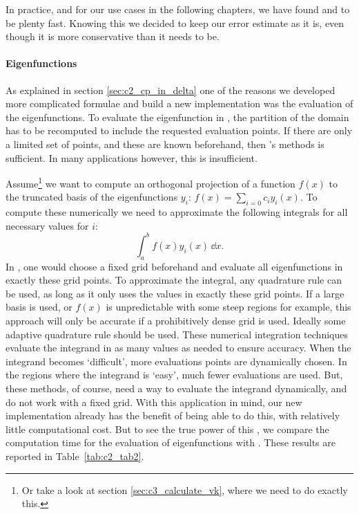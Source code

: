 In practice, and for our use cases in the following chapters, we have found  and \pyslise{} to be plenty fast. Knowing this we decided to keep our error estimate as it is, even though it is more conservative than it needs to be.

\paragraph{Eigenfunctions} As explained in section \ref{sec:c2_cp_in_delta} one of the reasons we developed more complicated formulae and build a new implementation was the evaluation of the eigenfunctions. To evaluate the eigenfunction in , the partition of the domain has to be recomputed to include the requested evaluation points. If there are only a limited set of points, and these are known beforehand, then 's methods is sufficient. In many applications however, this is insufficient.

Assume\footnote{Or take a look at section \ref{sec:c3_calculate_vk}, where we need to do exactly this.} we want to compute an orthogonal projection of a function $f(x)$ to the truncated basis of the eigenfunctions $y_i$: $ f(x) = \sum_{i = 0} c_i y_i(x)$.
To compute these numerically we need to approximate the following integrals for all necessary values for $i$:
$$
\int_a^b f(x) y_i(x)\,\dd x\text{.}
$$
In , one would choose a fixed grid beforehand and evaluate all eigenfunctions in exactly these grid points. To approximate the integral, any quadrature rule can be used, as long as it only uses the values in exactly these grid points. If a large basis is used, or $f(x)$ is unpredictable with some steep regions for example, this approach will only be accurate if a prohibitively dense grid is used. Ideally some adaptive quadrature rule should be used. These numerical integration techniques evaluate the integrand in as many values as needed to ensure accuracy. When the integrand becomes `difficult', more evaluations points are dynamically chosen. In the regions where the integrand is `easy', much fewer evaluations are used. But, these methods, of course, need a way to evaluate the integrand dynamically, and do not work with a fixed grid. With this application in mind, our new implementation already has the benefit of being able to do this, with relatively little computational cost. But to see the true power of this , we compare the computation time for the evaluation of eigenfunctions with . These results are reported in Table~\ref{tab:c2_tab2}.

